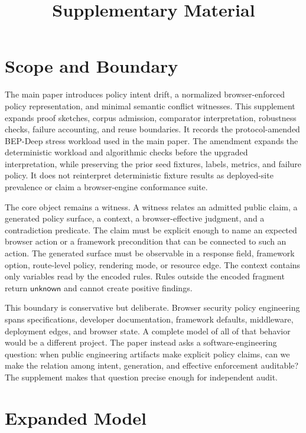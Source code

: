 \documentclass[10pt,conference]{IEEEtran}
\newcommand{\unknown}{\ensuremath{\mathsf{unknown}}}
\begin{document}
\title{Supplementary Material}
\author{}
\maketitle

\section{Scope and Boundary}

The main paper introduces policy intent drift, a normalized browser-enforced policy representation, and minimal semantic conflict witnesses. This supplement expands proof sketches, corpus admission, comparator interpretation, robustness checks, failure accounting, and reuse boundaries. It records the protocol-amended BEP-Deep stress workload used in the main paper. The amendment expands the deterministic workload and algorithmic checks before the upgraded interpretation, while preserving the prior seed fixtures, labels, metrics, and failure policy. It does not reinterpret deterministic fixture results as deployed-site prevalence or claim a browser-engine conformance suite.

The core object remains a witness. A witness relates an admitted public claim, a generated policy surface, a context, a browser-effective judgment, and a contradiction predicate. The claim must be explicit enough to name an expected browser action or a framework precondition that can be connected to such an action. The generated surface must be observable in a response field, framework option, route-level policy, rendering mode, or resource edge. The context contains only variables read by the encoded rules. Rules outside the encoded fragment return \unknown{} and cannot create positive findings.

This boundary is conservative but deliberate. Browser security policy engineering spans specifications, developer documentation, framework defaults, middleware, deployment edges, and browser state. A complete model of all of that behavior would be a different project. The paper instead asks a software-engineering question: when public engineering artifacts make explicit policy claims, can we make the relation among intent, generation, and effective enforcement auditable? The supplement makes that question precise enough for independent audit.

\section{Expanded Model}
\end{document}
